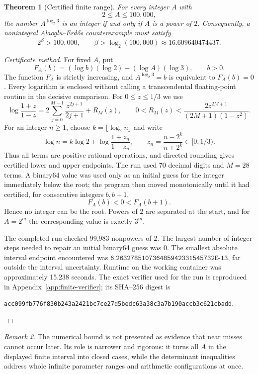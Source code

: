 \documentclass[11pt,oneside]{article}
\newtheorem{theorem}{Theorem}[section]
\theoremstyle{definition}
\theoremstyle{remark}
\newtheorem{remark}[theorem]{Remark}
\begin{document}
\begin{theorem}[Certified finite range]
\label{thm:finite-range}
For every integer $A$ with
\[
  2\le A\le 100,000,
\]
the number $A^{\log_2 3}$ is an integer if and only if $A$ is a power
of $2$.  Consequently, a nonintegral Alaoglu--Erd\H{o}s counterexample must
satisfy
\[
  2^\beta>100,000,
  \qquad
  \beta>\log_2(100,000)\approx 16.609640474437.
\]
\end{theorem}

\begin{proof}[Certificate method]
For fixed $A$, put
\[
  F_A(b)=(\log b)(\log 2)-(\log A)(\log 3),\qquad b>0.
\]
The function $F_A$ is strictly increasing, and
$A^{\log_2 3}=b$ is equivalent to $F_A(b)=0$.
Every logarithm is enclosed without calling a transcendental floating-point
routine in the decisive comparison.  For $0\le z\le 1/3$ we use
\[
  \log\frac{1+z}{1-z}
  =2\sum_{j=0}^{M-1}\frac{z^{2j+1}}{2j+1}+R_M(z),
  \qquad
  0<R_M(z)<
  \frac{2z^{2M+1}}{(2M+1)(1-z^2)}.
\]
For an integer $n\ge1$, choose $k=\lfloor\log_2 n\rfloor$ and write
\[
  \log n=k\log2+
  \log\frac{1+z_n}{1-z_n},
  \qquad
  z_n=\frac{n-2^k}{n+2^k}\in[0,1/3).
\]
Thus all terms are positive rational operations, and directed rounding gives
certified lower and upper endpoints.  The run used 70 decimal digits and
$M=28$ terms.  A binary64 value was used only as an initial guess for the
integer immediately below the root; the program then moved monotonically
until it had certified, for consecutive integers $b,b+1$,
\[
  F_A(b)<0<F_A(b+1).
\]
Hence no integer can be the root.  Powers of $2$ are separated at the start,
and for $A=2^m$ the corresponding value is exactly $3^m$.

The completed run checked 99,983 nonpowers of $2$.  The largest number of
integer steps needed to repair an initial binary64 guess was 0.  The
smallest absolute interval endpoint encountered was
$\texttt{6.263278510736485942331545732E-13}$, far outside the interval uncertainty.  Runtime on the
working container was approximately 15.238 seconds.  The exact verifier
used for the run is reproduced in Appendix~\ref{app:finite-verifier}; its
SHA--256 digest is
\begin{center}
\texttt{acc099fb776f830b243a2421bc7ce27d5bedc63a38c3a7b190accb3c621cbadd}.
\end{center}
\end{proof}

\begin{remark}
The numerical bound is not presented as evidence that near misses cannot occur
later.  Its role is narrower and rigorous: it turns all $A$ in the displayed
finite interval into closed cases, while the determinant inequalities address
whole infinite parameter ranges and arithmetic configurations at once.
\end{remark}
\end{document}
